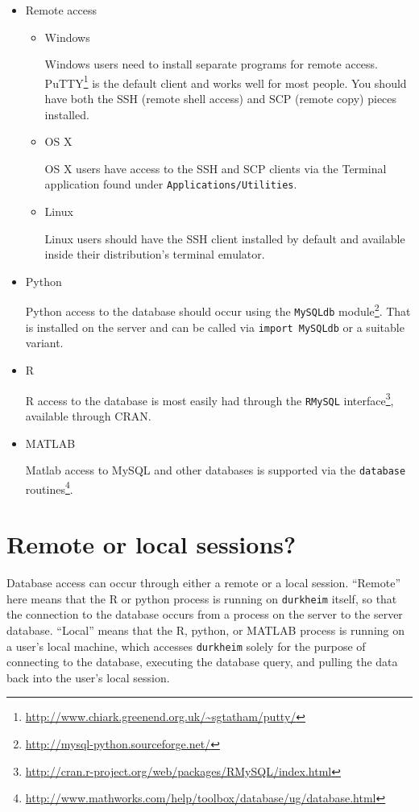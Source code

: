 \documentclass[11pt]{article}
\begin{document}
\begin{itemize}
\item Remote access
  \begin{itemize}
  \item Windows 

    Windows users need to install separate programs for
    remote
    access. PuTTY\footnote{\url{http://www.chiark.greenend.org.uk/~sgtatham/putty/}}
    is the default client and works well for most people. You should
    have both the SSH (remote shell access) and SCP (remote copy)
    pieces installed.
  \item OS X 

    OS X users have access to the SSH and SCP clients via the Terminal
    application found under \texttt{Applications/Utilities}.
  \item Linux 

    Linux users should have the SSH client installed by
    default and available inside their distribution's terminal emulator.
  \end{itemize}
\item Python

Python access to the database should occur using the \texttt{MySQLdb}
module\footnote{\url{http://mysql-python.sourceforge.net/}}. That is
installed on the server and can be called via \texttt{import MySQLdb}
or a suitable variant.
\item R

R access to the database is most easily had through the
\texttt{RMySQL}
interface\footnote{\url{http://cran.r-project.org/web/packages/RMySQL/index.html}},
available through CRAN.
\item MATLAB

Matlab access to MySQL and other databases is supported via the
\texttt{database}
routines\footnote{\url{http://www.mathworks.com/help/toolbox/database/ug/database.html}}. 
\end{itemize}

\section{Remote or local sessions?}
\label{sec:remote-or-local}

Database access can occur through either a remote or a local
session. ``Remote'' here means that the R or python process is running
on \texttt{durkheim} itself, so that the connection to the database
occurs from a process on the server to the server database. ``Local''
means that the R, python, or MATLAB process is running on a user's
local machine, which accesses \texttt{durkheim} solely for the
purpose of connecting to the database, executing the database query,
and pulling the data back into the user's local session. 
\end{document}
